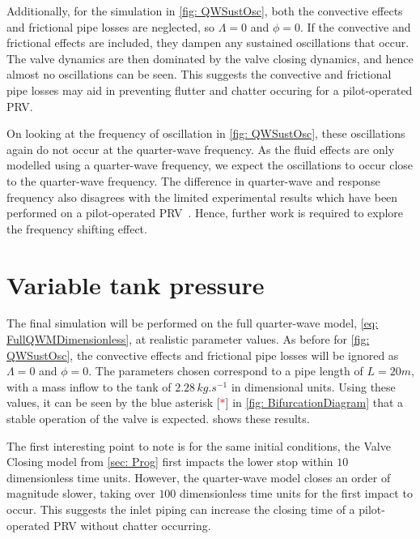 Additionally, for the simulation in \cref{fig: QWSustOsc}, both the convective effects and frictional pipe losses are neglected, so $\Lambda = 0$ and $\phi = 0$. If the convective and frictional effects are included, they dampen any sustained oscillations that occur. The valve dynamics are then dominated by the valve closing dynamics, and hence almost no oscillations can be seen. This suggests the convective and frictional pipe losses may aid in preventing flutter and chatter occuring for a pilot-operated PRV.

On looking at the frequency of oscillation in \cref{fig: QWSustOsc}, these oscillations again do not occur at the quarter-wave frequency. As the fluid effects are only modelled using a quarter-wave frequency, we expect the oscillations to occur close to the quarter-wave frequency. The difference in quarter-wave and response frequency also disagrees with the limited experimental results which have been performed on a pilot-operated PRV~\cite{Allison2015TestingValves}. Hence, further work is required to explore the frequency shifting effect.

\section{Variable tank pressure}

The final simulation will be performed on the full quarter-wave model, \cref{eq: FullQWMDimensionless}, at realistic parameter values. As before for \cref{fig: QWSustOsc}, the convective effects and frictional pipe losses will be ignored as $\Lambda = 0$ and $\phi = 0$. The parameters chosen correspond to a pipe length of $L = 20 \si{m}$, with a mass inflow to the tank of $2.28 \, \si{kg.s^{-1}}$ in dimensional units. Using these values, it can be seen by the blue asterisk [\textcolor{Red}{$*$}] in \cref{fig: BifurcationDiagram} that a stable operation of the valve is expected.  shows these results.
~


The first interesting point to note is for the same initial conditions, the Valve Closing model from \cref{sec: Prog} first impacts the lower stop within $10$ dimensionless time units. However, the quarter-wave model closes an order of magnitude slower, taking over $100$ dimensionless time units for the first impact to occur. This suggests the inlet piping can increase the closing time of a pilot-operated PRV without chatter occurring.

